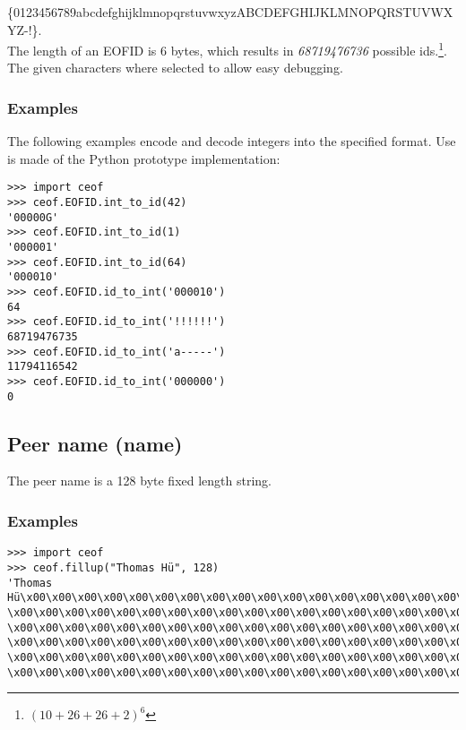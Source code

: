 \small{\{0123456789abcdefghijklmnopqrstuvwxyzABCDEFGHIJKLMNOPQRSTUVWXYZ-!\}}.\\
The length of an EOFID is 6 bytes, which results in
\emph{68719476736} possible ids.\footnote{$(10+26+26+2)^6$}.
The given characters where selected to allow easy debugging.
\subsubsection{Examples}
The following examples encode and decode integers into the specified format.
Use is made of the Python prototype implementation:
\begin{verbatim}
>>> import ceof
>>> ceof.EOFID.int_to_id(42)
'00000G'
>>> ceof.EOFID.int_to_id(1)
'000001'
>>> ceof.EOFID.int_to_id(64)
'000010'
>>> ceof.EOFID.id_to_int('000010')
64
>>> ceof.EOFID.id_to_int('!!!!!!')
68719476735
>>> ceof.EOFID.id_to_int('a-----')
11794116542
>>> ceof.EOFID.id_to_int('000000')
0
\end{verbatim}
\subsection{Peer name (name)}
The peer name is a 128 byte fixed length string.
\subsubsection{Examples}
\begin{verbatim}
>>> import ceof
>>> ceof.fillup("Thomas Hü", 128)
'Thomas Hü\x00\x00\x00\x00\x00\x00\x00\x00\x00\x00\x00\x00\x00\x00\x00\x00\x00\x00
\x00\x00\x00\x00\x00\x00\x00\x00\x00\x00\x00\x00\x00\x00\x00\x00\x00\x00\x00\x00
\x00\x00\x00\x00\x00\x00\x00\x00\x00\x00\x00\x00\x00\x00\x00\x00\x00\x00\x00\x00
\x00\x00\x00\x00\x00\x00\x00\x00\x00\x00\x00\x00\x00\x00\x00\x00\x00\x00\x00\x00
\x00\x00\x00\x00\x00\x00\x00\x00\x00\x00\x00\x00\x00\x00\x00\x00\x00\x00\x00\x00
\x00\x00\x00\x00\x00\x00\x00\x00\x00\x00\x00\x00\x00\x00\x00\x00\x00\x00\x00\x00\x00'
\end{verbatim}
